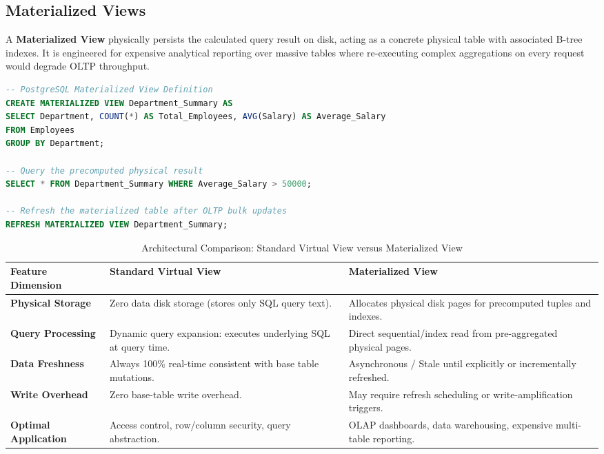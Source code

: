 \subsection{Materialized Views}
A \textbf{Materialized View} physically persists the calculated query result on disk, acting as a concrete physical table with associated B-tree indexes. It is engineered for expensive analytical reporting over massive tables where re-executing complex aggregations on every request would degrade OLTP throughput.
\begin{lstlisting}[language=SQL]
-- PostgreSQL Materialized View Definition
CREATE MATERIALIZED VIEW Department_Summary AS
SELECT Department, COUNT(*) AS Total_Employees, AVG(Salary) AS Average_Salary
FROM Employees
GROUP BY Department;

-- Query the precomputed physical result
SELECT * FROM Department_Summary WHERE Average_Salary > 50000;

-- Refresh the materialized table after OLTP bulk updates
REFRESH MATERIALIZED VIEW Department_Summary;
\end{lstlisting}

\begin{table}[htbp]
\centering
\small
\caption{Architectural Comparison: Standard Virtual View versus Materialized View}
\label{tab:view_vs_materialized_view}
\begin{tabularx}{\textwidth}{p{3.2cm} X X}
\toprule
\textbf{Feature Dimension} & \textbf{Standard Virtual View} & \textbf{Materialized View} \\
\midrule
\textbf{Physical Storage} & Zero data disk storage (stores only SQL query text). & Allocates physical disk pages for precomputed tuples and indexes. \\
\textbf{Query Processing} & Dynamic query expansion: executes underlying SQL at query time. & Direct sequential/index read from pre-aggregated physical pages. \\
\textbf{Data Freshness} & Always 100\% real-time consistent with base table mutations. & Asynchronous / Stale until explicitly or incrementally refreshed. \\
\textbf{Write Overhead} & Zero base-table write overhead. & May require refresh scheduling or write-amplification triggers. \\
\textbf{Optimal Application} & Access control, row/column security, query abstraction. & OLAP dashboards, data warehousing, expensive multi-table reporting. \\
\bottomrule
\end{tabularx}
\end{table}

